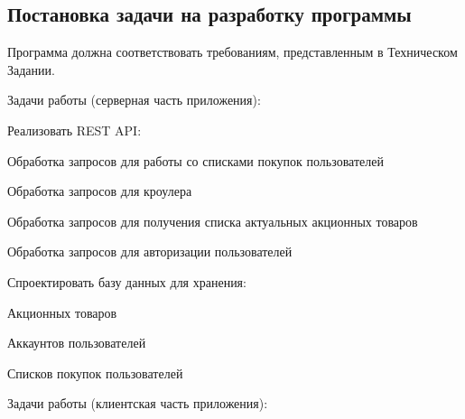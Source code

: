 \subsection{Постановка задачи на разработку программы}
Программа должна соответствовать требованиям, представленным в 
Техническом Задании.

\bigskip
Задачи работы (серверная часть приложения):

\smallskip
\begin{my_enumerate}
  \item Реализовать REST API:
    \begin{my_enumerate}
      \item Обработка запросов для работы со списками покупок пользователей
      \item Обработка запросов для кроулера
      \item Обработка запросов для получения списка актуальных акционных
        товаров
      \item Обработка запросов для авторизации пользователей
    \end{my_enumerate}
  \item Спроектировать базу данных для хранения:
    \begin{my_enumerate}
      \item Акционных товаров
      \item Аккаунтов пользователей
      \item Списков покупок пользователей
    \end{my_enumerate}
\end{my_enumerate}

\bigskip
Задачи работы (клиентская часть приложения):

\smallskip
